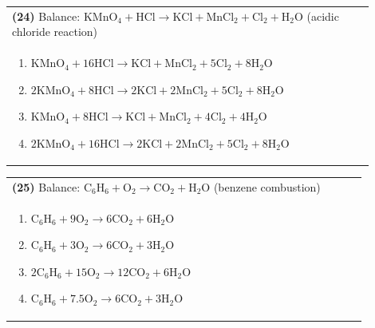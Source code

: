 \documentclass{article}
\begin{document}
{\vspace{0.2cm}
\noindent \begin{tabular}{|p{0.9\linewidth}|}
\hline
\vspace{0.2cm}
\textbf{(24)} Balance: \(\mathrm{KMnO_4 + HCl \rightarrow KCl + MnCl_2 + Cl_2 + H_2O}\) (acidic chloride reaction)\\
\begin{minipage}[t]{0.85\linewidth}
\begin{enumerate}[label=\alph*.]
   \item \(\mathrm{KMnO_4 + 16HCl \rightarrow KCl + MnCl_2 + 5Cl_2 + 8H_2O}\)
   \item \(\mathrm{2KMnO_4 + 8HCl \rightarrow 2KCl + 2MnCl_2 + 5Cl_2 + 8H_2O}\)
   \item \(\mathrm{KMnO_4 + 8HCl \rightarrow KCl + MnCl_2 + 4Cl_2 + 4H_2O}\)
   \item \(\mathrm{2KMnO_4 + 16HCl \rightarrow 2KCl + 2MnCl_2 + 5Cl_2 + 8H_2O}\)
\end{enumerate}
\end{minipage}\\
\hline
\end{tabular}
\newpage

\vspace{0.2cm}
\noindent \begin{tabular}{|p{0.9\linewidth}|}
\hline
\vspace{0.2cm}
\textbf{(25)} Balance: \(\mathrm{C_6H_6 + O_2 \rightarrow CO_2 + H_2O}\) (benzene combustion)\\
\begin{minipage}[t]{0.85\linewidth}
\begin{enumerate}[label=\alph*.]
   \item \(\mathrm{C_6H_6 + 9O_2 \rightarrow 6CO_2 + 6H_2O}\)
   \item \(\mathrm{C_6H_6 + 3O_2 \rightarrow 6CO_2 + 3H_2O}\)
   \item \(\mathrm{2C_6H_6 + 15O_2 \rightarrow 12CO_2 + 6H_2O}\)
   \item \(\mathrm{C_6H_6 + 7.5O_2 \rightarrow 6CO_2 + 3H_2O}\)
\end{enumerate}
\end{minipage}\\
\hline
\end{tabular}

}
\end{document}
